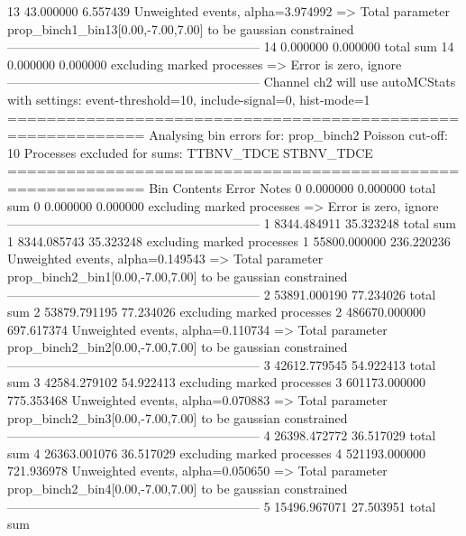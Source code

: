 13         43.000000       6.557439        Unweighted events, alpha=3.974992
  => Total parameter prop_binch1_bin13[0.00,-7.00,7.00] to be gaussian constrained
------------------------------------------------------------
14         0.000000        0.000000        total sum                     
14         0.000000        0.000000        excluding marked processes    
  => Error is zero, ignore      
------------------------------------------------------------
Channel ch2 will use autoMCStats with settings: event-threshold=10, include-signal=0, hist-mode=1
============================================================
Analysing bin errors for: prop_binch2
Poisson cut-off: 10
Processes excluded for sums: TTBNV_TDCE STBNV_TDCE
============================================================
Bin        Contents        Error           Notes                         
0          0.000000        0.000000        total sum                     
0          0.000000        0.000000        excluding marked processes    
  => Error is zero, ignore      
------------------------------------------------------------
1          8344.484911     35.323248       total sum                     
1          8344.085743     35.323248       excluding marked processes    
1          55800.000000    236.220236      Unweighted events, alpha=0.149543
  => Total parameter prop_binch2_bin1[0.00,-7.00,7.00] to be gaussian constrained
------------------------------------------------------------
2          53891.000190    77.234026       total sum                     
2          53879.791195    77.234026       excluding marked processes    
2          486670.000000   697.617374      Unweighted events, alpha=0.110734
  => Total parameter prop_binch2_bin2[0.00,-7.00,7.00] to be gaussian constrained
------------------------------------------------------------
3          42612.779545    54.922413       total sum                     
3          42584.279102    54.922413       excluding marked processes    
3          601173.000000   775.353468      Unweighted events, alpha=0.070883
  => Total parameter prop_binch2_bin3[0.00,-7.00,7.00] to be gaussian constrained
------------------------------------------------------------
4          26398.472772    36.517029       total sum                     
4          26363.001076    36.517029       excluding marked processes    
4          521193.000000   721.936978      Unweighted events, alpha=0.050650
  => Total parameter prop_binch2_bin4[0.00,-7.00,7.00] to be gaussian constrained
------------------------------------------------------------
5          15496.967071    27.503951       total sum                     
